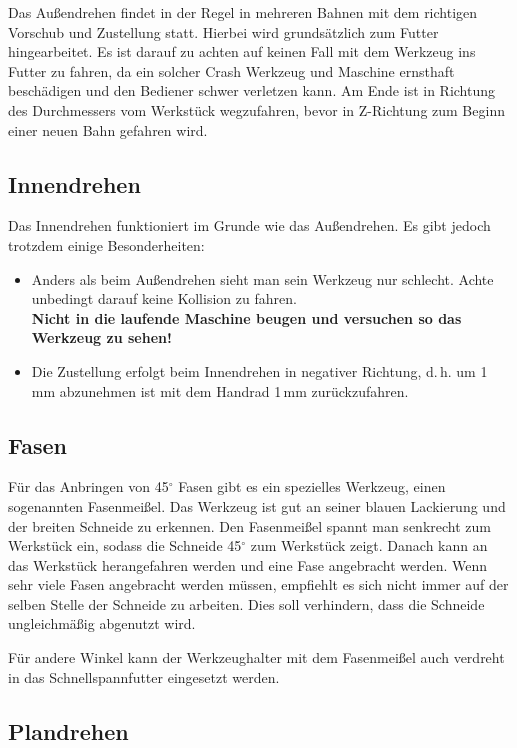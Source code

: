 \documentclass{\basedir/fablab-document}
\begin{document}
Das Außendrehen findet in der Regel in mehreren Bahnen mit dem richtigen Vorschub und Zustellung statt.
Hierbei wird grundsätzlich zum Futter hingearbeitet.
Es ist darauf zu achten auf keinen Fall mit dem Werkzeug ins Futter zu fahren, da ein solcher Crash Werkzeug und Maschine ernsthaft beschädigen und den Bediener schwer verletzen kann.
Am Ende ist in Richtung des Durchmessers vom Werkstück wegzufahren, bevor in Z-Richtung zum Beginn einer neuen Bahn gefahren wird.

\subsection{Innendrehen}

Das Innendrehen funktioniert im Grunde wie das Außendrehen. Es gibt jedoch trotzdem einige Besonderheiten:
\begin{itemize}
\item Anders als beim Außendrehen sieht man sein Werkzeug nur schlecht. Achte unbedingt darauf keine Kollision zu fahren.\\
\textbf{Nicht in die laufende Maschine beugen und versuchen so das Werkzeug zu sehen!}
\item Die Zustellung erfolgt beim Innendrehen in negativer Richtung, d.\,h. um 1\,mm abzunehmen ist mit dem Handrad 1\,mm zurückzufahren.
\end{itemize}

\subsection{Fasen}

Für das Anbringen von 45$^\circ$ Fasen gibt es ein spezielles Werkzeug, einen sogenannten Fasenmeißel.
Das Werkzeug ist gut an seiner blauen Lackierung und der breiten Schneide zu erkennen. 
Den Fasenmeißel spannt man senkrecht zum Werkstück ein, sodass die Schneide 45$^\circ$ zum Werkstück zeigt.
Danach kann an das Werkstück herangefahren werden und eine Fase angebracht werden.
Wenn sehr viele Fasen angebracht werden müssen, empfiehlt es sich nicht immer auf der selben Stelle der Schneide zu arbeiten.
Dies soll verhindern, dass die Schneide ungleichmäßig abgenutzt wird.

Für andere Winkel kann der Werkzeughalter mit dem Fasenmeißel auch verdreht in das Schnellspannfutter eingesetzt werden.

\subsection{Plandrehen}
\label{handdrehen:Plandrehen}
\end{document}
